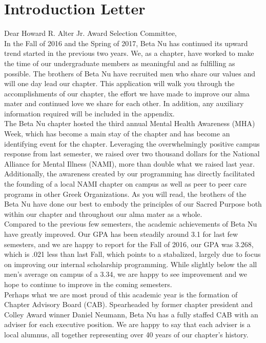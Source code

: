 \chapter{Introduction Letter}

Dear Howard R. Alter Jr. Award Selection Committee, \\

In the Fall of 2016 and the Spring of 2017, Beta Nu has continued its upward trend started in the previous two years. We, as a chapter, have worked to make the time of our undergraduate members as meaningful and as fulfilling as possible.  The brothers of Beta Nu have recruited men who share our values and will one day lead our chapter. This application will walk you through the accomplishments of our chapter, the effort we have made to improve our alma mater and continued love we share for each other. In addition, any auxiliary information required will be included in the appendix. \\

The Beta Nu chapter hosted the third annual Mental Health Awareness (MHA) Week, which has become a main stay of the chapter and has become an identifying event for the chapter. Leveraging the overwhelmingly positive campus response from last semester, we raised over two thousand dollars for the National Alliance for Mental Illness (NAMI), more than double what we raised last year. Additionally, the awareness created by our programming has directly facilitated the founding of a local NAMI chapter on campus as well as peer to peer care programs in other Greek Organizations. As you will read, the brothers of the Beta Nu have done our best to embody the principles of our Sacred Purpose both within our chapter and throughout our alma mater as a whole. \\

Compared to the previous few semesters, the academic achievements of Beta Nu have greatly improved. Our GPA has been steadily around 3.1 for last few semesters, and we are happy to report for the Fall of 2016, our GPA was 3.268, which is .021 less than last Fall, which points to a stabalized, largely due to focus on improving our internal scholarship programming. While slightly below the all men’s average on campus of a 3.34, we are happy to see improvement and we hope to continue to improve in the coming semesters. \\

Perhaps what we are most proud of this academic year is the formation of Chapter Advisory Board (CAB). Spearheaded by former chapter president and Colley Award winner Daniel Neumann, Beta Nu has a fully staffed CAB with an adviser for each executive position. We are happy to say that each adviser is a local alumnus, all together representing over 40 years of our chapter’s history. \\


